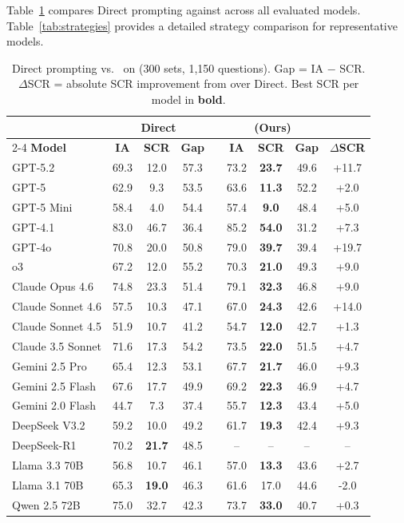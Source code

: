 Table~\ref{tab:main} compares Direct prompting against \method{} across all evaluated models. Table~\ref{tab:strategies} provides a detailed strategy comparison for representative models.

\begin{table}[t]
\caption{Direct prompting vs.\ \method{} on \bench{} (300 sets, 1,150 questions). Gap = IA $-$ SCR. $\Delta$SCR = absolute SCR improvement from \method{} over Direct. Best SCR per model in \textbf{bold}.}
\label{tab:main}
\begin{center}
\small
\setlength{\tabcolsep}{3.5pt}
\begin{tabular}{l ccc c ccc c}
\toprule
 & \multicolumn{3}{c}{\textbf{Direct}} & & \multicolumn{3}{c}{\textbf{\method{} (Ours)}} & \\
\cmidrule{2-4} \cmidrule{6-8}
\textbf{Model} & \textbf{IA} & \textbf{SCR} & \textbf{Gap} & & \textbf{IA} & \textbf{SCR} & \textbf{Gap} & \textbf{$\Delta$SCR} \\
\midrule
GPT-5.2 & 69.3 & 12.0 & 57.3 & & 73.2 & \textbf{23.7} & 49.6 & +11.7 \\
GPT-5 & 62.9 & 9.3 & 53.5 & & 63.6 & \textbf{11.3} & 52.2 & +2.0 \\
GPT-5 Mini & 58.4 & 4.0 & 54.4 & & 57.4 & \textbf{9.0} & 48.4 & +5.0 \\
GPT-4.1 & 83.0 & 46.7 & 36.4 & & 85.2 & \textbf{54.0} & 31.2 & +7.3 \\
GPT-4o & 70.8 & 20.0 & 50.8 & & 79.0 & \textbf{39.7} & 39.4 & +19.7 \\
o3 & 67.2 & 12.0 & 55.2 & & 70.3 & \textbf{21.0} & 49.3 & +9.0 \\
Claude Opus 4.6 & 74.8 & 23.3 & 51.4 & & 79.1 & \textbf{32.3} & 46.8 & +9.0 \\
Claude Sonnet 4.6 & 57.5 & 10.3 & 47.1 & & 67.0 & \textbf{24.3} & 42.6 & +14.0 \\
Claude Sonnet 4.5 & 51.9 & 10.7 & 41.2 & & 54.7 & \textbf{12.0} & 42.7 & +1.3 \\
Claude 3.5 Sonnet & 71.6 & 17.3 & 54.2 & & 73.5 & \textbf{22.0} & 51.5 & +4.7 \\
Gemini 2.5 Pro & 65.4 & 12.3 & 53.1 & & 67.7 & \textbf{21.7} & 46.0 & +9.3 \\
Gemini 2.5 Flash & 67.6 & 17.7 & 49.9 & & 69.2 & \textbf{22.3} & 46.9 & +4.7 \\
Gemini 2.0 Flash & 44.7 & 7.3 & 37.4 & & 55.7 & \textbf{12.3} & 43.4 & +5.0 \\
DeepSeek V3.2 & 59.2 & 10.0 & 49.2 & & 61.7 & \textbf{19.3} & 42.4 & +9.3 \\
DeepSeek-R1 & 70.2 & \textbf{21.7} & 48.5 & & -- & -- & -- & -- \\
Llama 3.3 70B & 56.8 & 10.7 & 46.1 & & 57.0 & \textbf{13.3} & 43.6 & +2.7 \\
Llama 3.1 70B & 65.3 & \textbf{19.0} & 46.3 & & 61.6 & 17.0 & 44.6 & -2.0 \\
Qwen 2.5 72B & 75.0 & 32.7 & 42.3 & & 73.7 & \textbf{33.0} & 40.7 & +0.3 \\
\bottomrule
\end{tabular}
\end{center}
\end{table}

